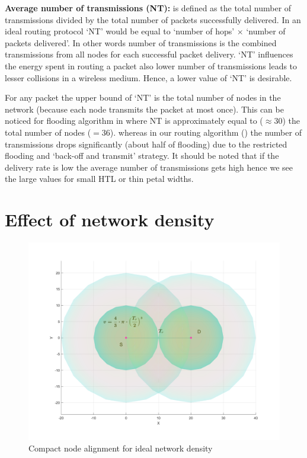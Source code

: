 \textbf{Average number of transmissions (NT):} is defined as the total number of transmissions divided by the total number of packets successfully delivered. In an ideal routing protocol `NT' would be equal to `number of hops' $\times$ `number of packets delivered'. In other words number of transmissions is the combined transmissions from all nodes for each successful packet delivery. `NT' influences the energy spent in routing a packet also lower number of transmissions leads to lesser collisions in a wireless medium. Hence, a lower value of `NT' is desirable. 

For any packet the upper bound of `NT' is the total number of nodes in the network (because each node transmits the packet at most once). This can be noticed for flooding algorithm in  where NT is approximately equal to ($ \approx 30$) the total number of nodes ($ = 36$). whereas in our routing algorithm () the number of transmissions drops significantly (about half of flooding) due to the restricted flooding and `back-off and transmit' strategy. It should be noted that if the delivery rate is low the average number of transmissions gets high hence we see the large values for small HTL or thin petal widths.

\section{Effect of network density}

\begin{figure}[hbtp]
\centering
\includegraphics[width=\simResultFigSize\textwidth]{ncsuthesis-0.6/Chapter-5/figs/nodeDensity}
\caption{Compact node alignment for ideal network density}
\label{fig:node_density}
\end{figure}

